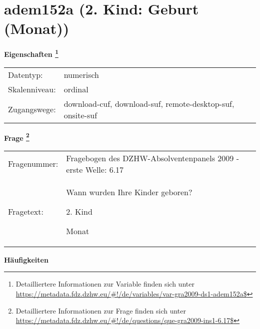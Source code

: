 
    \setcounter{footnote}{0}

    \vspace*{-1.8cm}
	\section{adem152a (2. Kind: Geburt (Monat))}
	\label{section:adem152a}



    \vspace*{0.5cm}
    \noindent\textbf{Eigenschaften
	\footnote{Detailliertere Informationen zur Variable finden sich unter
		\url{https://metadata.fdz.dzhw.eu/\#!/de/variables/var-gra2009-ds1-adem152a$}}}\\
	\begin{tabularx}{\hsize}{@{}lX}
	Datentyp: & numerisch \\
	Skalenniveau: & ordinal \\
	Zugangswege: &
	  download-cuf, 
	  download-suf, 
	  remote-desktop-suf, 
	  onsite-suf
 \\
    \end{tabularx}



				\vspace*{0.5cm}
                \noindent\textbf{Frage
	                \footnote{Detailliertere Informationen zur Frage finden sich unter
		              \url{https://metadata.fdz.dzhw.eu/\#!/de/questions/que-gra2009-ins1-6.17$}}}\\
				\begin{tabularx}{\hsize}{@{}lX}
					Fragenummer: &
					  Fragebogen des DZHW-Absolventenpanels 2009 - erste Welle:
					  6.17
 \\
					Fragetext: & Wann wurden Ihre Kinder geboren?\par  2. Kind\par  Monat \\
				\end{tabularx}





        		\vspace*{0.5cm}
                \noindent\textbf{Häufigkeiten}

